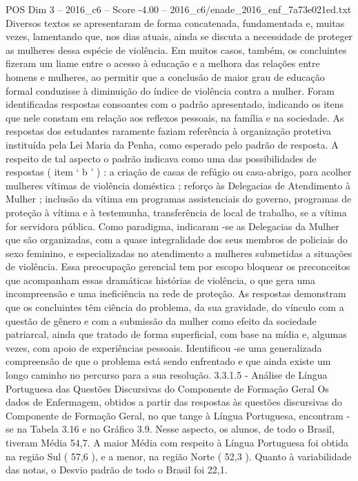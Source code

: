 \begin{textsample}{POS Dim 3 – 2016\_c6 – Score -4.00 – 2016\_c6/enade\_2016\_enf\_7a73e021ed.txt}
Diversos textos se apresentaram de forma concatenada, fundamentada e, muitas vezes, lamentando que, nos dias atuais, ainda se discuta a necessidade de proteger as mulheres dessa espécie de violência.
Em muitos casos, também, os concluintes fizeram um liame entre o acesso à educação e a melhora das relações entre homens e mulheres, ao permitir que a conclusão de maior grau de educação formal conduzisse à diminuição do índice de violência contra a mulher.
Foram identificadas respostas consoantes com o padrão apresentado, indicando os itens que nele constam em relação aos reflexos pessoais, na família e na sociedade.
As respostas dos estudantes raramente faziam referência à organização protetiva instituída pela Lei Maria da Penha, como esperado pelo padrão de resposta.
A respeito de tal aspecto o padrão indicava como uma das possibilidades de respostas ( item ‘ b ’ ) : a criação de casas de refúgio ou casa-abrigo, para acolher mulheres vítimas de violência doméstica ; reforço às Delegacias de Atendimento à Mulher ; inclusão da vítima em programas assistenciais do governo, programas de proteção à vítima e à testemunha, transferência de local de trabalho, se a vítima for servidora pública.
Como paradigma, indicaram -se as Delegacias da Mulher que são organizadas, com a quase integralidade dos seus membros de policiais do sexo feminino, e especializadas no atendimento a mulheres submetidas a situações de violência.
Essa preocupação gerencial tem por escopo bloquear os preconceitos que acompanham essas dramáticas histórias de violência, o que gera uma incompreensão e uma ineficiência na rede de proteção.
As respostas demonstram que os concluintes têm ciência do problema, da sua gravidade, do vínculo com a questão de gênero e com a submissão da mulher como efeito da sociedade patriarcal, ainda que tratado de forma superficial, com base na mídia e, algumas vezes, com apoio de experiências pessoais.
Identificou -se uma generalizada compreensão de que o problema está sendo enfrentado e que ainda existe um longo caminho no percurso para a sua resolução. 3.3.1.5 - Análise de Língua Portuguesa das Questões Discursivas do Componente de Formação Geral Os dados de Enfermagem, obtidos a partir das respostas às questões discursivas do Componente de Formação Geral, no que tange à Língua Portuguesa, encontram -se na Tabela 3.16 e no Gráfico 3.9.
Nesse aspecto, os alunos, de todo o Brasil, tiveram Média 54,7.
A maior Média com respeito à Língua Portuguesa foi obtida na região Sul ( 57,6 ), e a menor, na região Norte ( 52,3 ).
Quanto à variabilidade das notas, o Desvio padrão de todo o Brasil foi 22,1.

\end{textsample}
